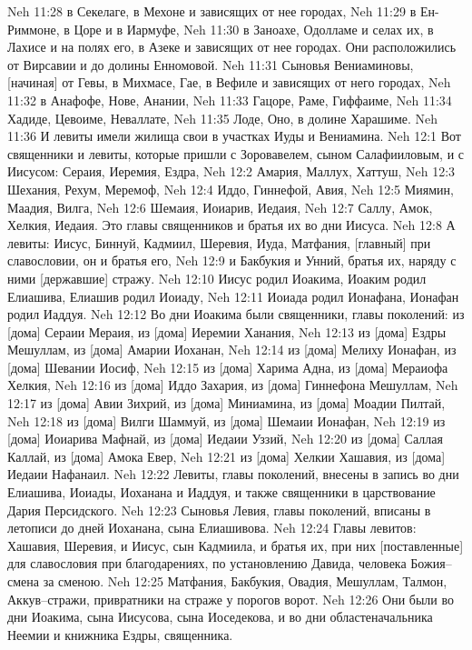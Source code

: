Neh 11:28  в Секелаге, в Мехоне и зависящих от нее городах,
Neh 11:29  в Ен-Риммоне, в Цоре и в Иармуфе,
Neh 11:30  в Заноахе, Одолламе и селах их, в Лахисе и на полях его, в Азеке и зависящих от нее городах. Они расположились от Вирсавии и до долины Енномовой.
Neh 11:31  Сыновья Вениаминовы, [начиная] от Гевы, в Михмасе, Гае, в Вефиле и зависящих от него городах,
Neh 11:32  в Анафофе, Нове, Анании,
Neh 11:33  Гацоре, Раме, Гиффаиме,
Neh 11:34  Хадиде, Цевоиме, Неваллате,
Neh 11:35  Лоде, Оно, в долине Харашиме.
Neh 11:36  И левиты имели жилища свои в участках Иуды и Вениамина.
Neh 12:1  Вот священники и левиты, которые пришли с Зоровавелем, сыном Салафииловым, и с Иисусом: Сераия, Иеремия, Ездра,
Neh 12:2  Амария, Маллух, Хаттуш,
Neh 12:3  Шехания, Рехум, Меремоф,
Neh 12:4  Иддо, Гиннефой, Авия,
Neh 12:5  Миямин, Маадия, Вилга,
Neh 12:6  Шемаия, Иоиарив, Иедаия,
Neh 12:7  Саллу, Амок, Хелкия, Иедаия. Это главы священников и братья их во дни Иисуса.
Neh 12:8  А левиты: Иисус, Биннуй, Кадмиил, Шеревия, Иуда, Матфания, [главный] при славословии, он и братья его,
Neh 12:9  и Бакбукия и Унний, братья их, наряду с ними [державшие] стражу.
Neh 12:10  Иисус родил Иоакима, Иоаким родил Елиашива, Елиашив родил Иоиаду,
Neh 12:11  Иоиада родил Ионафана, Ионафан родил Иаддуя.
Neh 12:12  Во дни Иоакима были священники, главы поколений: из [дома] Сераии Мераия, из [дома] Иеремии Ханания,
Neh 12:13  из [дома] Ездры Мешуллам, из [дома] Амарии Иоханан,
Neh 12:14  из [дома] Мелиху Ионафан, из [дома] Шевании Иосиф,
Neh 12:15  из [дома] Харима Адна, из [дома] Мераиофа Хелкия,
Neh 12:16  из [дома] Иддо Захария, из [дома] Гиннефона Мешуллам,
Neh 12:17  из [дома] Авии Зихрий, из [дома] Миниамина, из [дома] Моадии Пилтай,
Neh 12:18  из [дома] Вилги Шаммуй, из [дома] Шемаии Ионафан,
Neh 12:19  из [дома] Иоиарива Мафнай, из [дома] Иедаии Уззий,
Neh 12:20  из [дома] Саллая Каллай, из [дома] Амока Евер,
Neh 12:21  из [дома] Хелкии Хашавия, из [дома] Иедаии Нафанаил.
Neh 12:22  Левиты, главы поколений, внесены в запись во дни Елиашива, Иоиады, Иоханана и Иаддуя, и также священники в царствование Дария Персидского.
Neh 12:23  Сыновья Левия, главы поколений, вписаны в летописи до дней Иоханана, сына Елиашивова.
Neh 12:24  Главы левитов: Хашавия, Шеревия, и Иисус, сын Кадмиила, и братья их, при них [поставленные] для славословия при благодарениях, по установлению Давида, человека Божия--смена за сменою.
Neh 12:25  Матфания, Бакбукия, Овадия, Мешуллам, Талмон, Аккув--стражи, привратники на страже у порогов ворот.
Neh 12:26  Они были во дни Иоакима, сына Иисусова, сына Иоседекова, и во дни областеначальника Неемии и книжника Ездры, священника.
